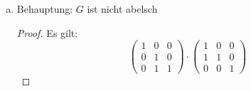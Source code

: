 \documentclass{article}
\theoremstyle{definition}
\begin{document}
\begin{enumerate}[(a)]
\begin{proof}
\begin{enumerate}[(G1)]
\begin{align*}
\begin{pmatrix}
                                -a_{n1} &   &   &        & 1
                            \end{pmatrix}\right.          \\
                            \leadsto \dots \leadsto
                            \begin{pmatrix}
                                1      &   &   &        &   \\
                                0      & 1 &   &        &   \\
                                0      & 0 & 1 &        &   \\
                                \vdots &   &   & \ddots &   \\
                                0      &   &   &        & 1
                            \end{pmatrix}     & \left| \begin{pmatrix}
                                1       &         &   &        &   \\
                                -a_{21} & 1       &   &        &   \\
                                *       & -a_{32} & 1 &        &   \\
                                \vdots  &         &   & \ddots &   \\
                                *       &         &   &        & 1
                            \end{pmatrix}\right. = A^{-1}
                        \end{align*}
                        Nach endlich vielen Schritten erhalten wir also eine untere Dreiecksmatrix $A^{-1}$.
              \end{enumerate}
          \end{proof}
    \item Behauptung: $G$ ist nicht abelsch
          \begin{proof}
              Es gilt:
              $$\begin{pmatrix}
                      1 & 0 & 0 \\
                      0 & 1 & 0 \\
                      0 & 1 & 1
                  \end{pmatrix}\cdot \begin{pmatrix}
                      1 & 0 & 0 \\
                      1 & 1 & 0 \\
                      0 & 0 & 1

\end{pmatrix}$$
\end{proof}
\end{enumerate}
\end{document}

